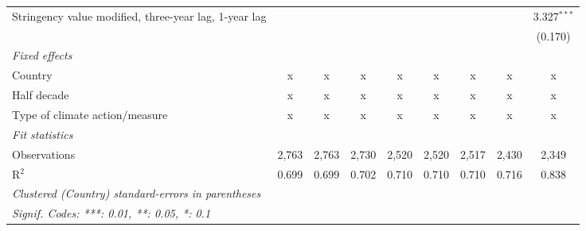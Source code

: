 \begin{table}[htbp]
\begin{tabular}{lcccccccc}
      Stringency value modified, three-year lag, 1-year lag                 &              &               &               &                &                &                &                & 3.327$^{***}$\\   
                                                                            &              &               &               &                &                &                &                & (0.170)\\   
      \emph{Fixed effects}\\
      Country                                                               & x            & x             & x             & x              & x              & x              & x              & x\\  
      Half decade                                                           & x            & x             & x             & x              & x              & x              & x              & x\\  
      Type of climate action/measure                                        & x            & x             & x             & x              & x              & x              & x              & x\\  
      \midrule \emph{Fit statistics}\\
      Observations                                                          & 2,763        & 2,763         & 2,730         & 2,520          & 2,520          & 2,517          & 2,430          & 2,349\\  
      R$^2$                                                                 & 0.699        & 0.699         & 0.702         & 0.710          & 0.710          & 0.710          & 0.716          & 0.838\\  
      \midrule
      \multicolumn{9}{l}{\emph{Clustered (Country) standard-errors in parentheses}}\\
      \multicolumn{9}{l}{\emph{Signif. Codes: ***: 0.01, **: 0.05, *: 0.1}}\\
   \end{tabular}
\end{table}


